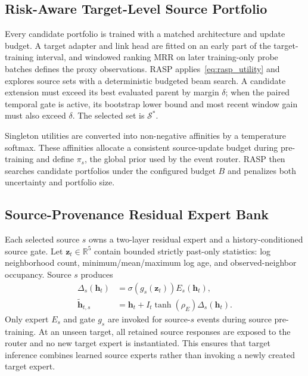 \documentclass[journal]{IEEEtran}
\begin{document}
\subsection{Risk-Aware Target-Level Source Portfolio}
Every candidate portfolio is trained with a matched architecture and update budget. A target adapter and link head are fitted on an early part of the target-training interval, and windowed ranking MRR on later training-only probe batches defines the proxy observations. RASP applies~\eqref{eq:rasp_utility} and explores source sets with a deterministic budgeted beam search. A candidate extension must exceed its best evaluated parent by margin $\delta$; when the paired temporal gate is active, its bootstrap lower bound and most recent window gain must also exceed $\delta$. The selected set is $\mathcal S^*$.

Singleton utilities are converted into non-negative affinities by a temperature softmax. These affinities allocate a consistent source-update budget during pre-training and define $\pi_s$, the global prior used by the event router. RASP then searches candidate portfolios under the configured budget $B$ and penalizes both uncertainty and portfolio size.

\subsection{Source-Provenance Residual Expert Bank}
Each selected source $s$ owns a two-layer residual expert and a history-conditioned source gate. Let $\mathbf z_t\in\mathbb R^5$ contain bounded strictly past-only statistics: log neighborhood count, minimum/mean/maximum log age, and observed-neighbor occupancy. Source $s$ produces
\begin{align}
\Delta_s(\mathbf h_t)&=\sigma(g_s(\mathbf z_t))E_s(\mathbf h_t),\\
\widetilde{\mathbf h}_{t,s}&=\mathbf h_t+I_t\tanh(\rho_E)\Delta_s(\mathbf h_t).
\end{align}
Only expert $E_s$ and gate $g_s$ are invoked for source-$s$ events during source pre-training. At an unseen target, all retained source responses are exposed to the router and no new target expert is instantiated. This ensures that target inference combines learned source experts rather than invoking a newly created target expert.
\end{document}
